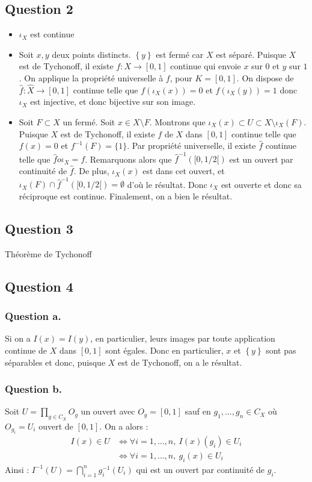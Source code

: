 \documentclass{cours}
\begin{document}
\subsection{Question 2}
\begin{itemize}
    \item $\iota_{X}$ est continue
    \item Soit $x, y$ deux points distincts. $\left\{y\right\}$ est fermé car $X$ est séparé. Puisque $X$ est de Tychonoff, il existe $f : X \rightarrow [0, 1]$ continue qui envoie $x$ sur $0$ et $y$ sur $1$. On applique la propriété universelle à $f$, pour $K = [0, 1]$. On dispose de $\hat{f} : \hat{X} \rightarrow [0, 1]$ continue telle que $f(\iota_{X}(x)) = 0$ et $f(\iota_{X}(y)) = 1$ donc $\iota_{X}$ est injective, et donc bijective sur son image. 
    \item Soit $F \subset X$ un fermé. Soit $x \in X \setminus F$. Montrons que $\iota_{X}(x) \subset U \subset X \setminus \iota_{X}(F)$. Puisque $X$ est de Tychonoff, il existe $f$ de $X$ dans $[0, 1]$ continue telle que $f(x) = 0$ et $f^{-1}(F) = \{1\}$. Par propriété universelle, il existe $\hat{f}$ continue telle que $\hat{f} o \iota_{X} = f$. Remarquons alors que $\hat{f}^{-1}([0, 1/2[)$ est un ouvert par continuité de $\hat{f}$. De plus, $\iota_{X}(x)$ est dans cet ouvert, et $\iota_{X}(F) \cap \hat{f}^{-1}([0, 1/2[) = \emptyset$ d'où le résultat. Donc $\iota_{X}$ est ouverte et donc sa réciproque est continue. Finalement, on a bien le résultat. 
\end{itemize}

\subsection{Question 3}
Théorème de Tychonoff

\subsection{Question 4}
\subsubsection{Question a.}
Si on a $I(x) = I(y)$, en particulier, leurs images par toute application continue de $X$ dans $[0, 1]$ sont égales. Donc en particulier, $x$ et $\left\{y\right\}$ sont pas séparables et donc, puisque $X$ est de Tychonoff, on a le résultat. 

\subsubsection{Question b.}
Soit $U = \prod_{g \in C_{X}} O_{g}$ un ouvert avec $O_{g} = [0, 1]$ sauf en $g_{1}, \ldots, g_{n} \in C_{X}$ où $O_{g_{i}} = U_{i}$ ouvert de $[0, 1]$. On a alors :
\begin{equation*}
    \begin{split}
        I(x) \in U &\Leftrightarrow \forall i = 1, \ldots, n,\ I(x)(g_{i}) \in U_{i}\\
        &\Leftrightarrow\forall i = 1, \ldots, n, \ g_{i}(x) \in U_{i}
    \end{split}
\end{equation*}
Ainsi : $I^{-1}(U) = \bigcap_{i = 1}^{n} g_{i}^{-1}(U_{i})$ qui est un ouvert par continuité de $g_{i}$. 
\end{document}
